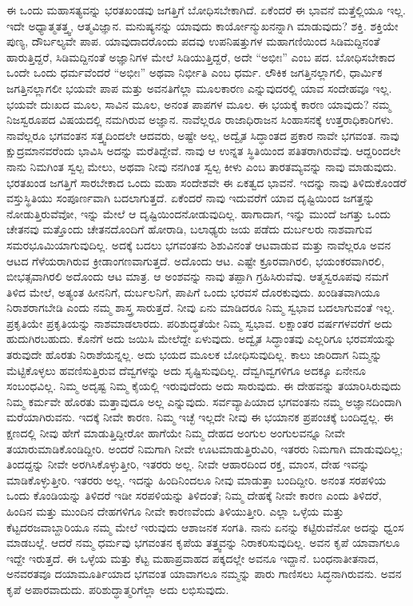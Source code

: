 ಈ ಒಂದು ಮಹಾಸತ್ಯವನ್ನು ಭರತಖಂಡವು ಜಗತ್ತಿಗೆ ಬೋಧಿಸಬೇಕಾಗಿದೆ. ಏಕೆಂದರೆ ಈ ಭಾವನೆ ಮತ್ತೆಲ್ಲಿಯೂ ಇಲ್ಲ. ಇದೇ ಅಧ್ಯಾತ್ಮತತ್ತ್ವ, ಆತ್ಮವಿಜ್ಞಾನ. ಮನುಷ್ಯನನ್ನು ಯಾವುದು ಕಾರ್ಯೋನ್ಮುಖನನ್ನಾಗಿ ಮಾಡುವುದು? ಶಕ್ತಿ. ಶಕ್ತಿಯೇ ಪುಣ್ಯ, ದೌರ್ಬಲ್ಯವೇ ಪಾಪ. ಯಾವುದಾದರೊಂದು ಪದವು ಉಪನಿಷತ್ತುಗಳ ಮಹಾಗಣಿಯಿಂದ ಸಿಡಿಮದ್ದಿನಂತೆ ಹಾರುತ್ತಿದ್ದರೆ, ಸಿಡಿಮದ್ದಿನಂತೆ ಅಜ್ಞಾನಿಗಳ ಮೇಲೆ ಸಿಡಿಯುತ್ತಿದ್ದರೆ, ಅದೇ “ಅಭೀಃ” ಎಂಬ ಪದ. ಬೋಧಿಸಬೇಕಾದ ಒಂದೇ ಒಂದು ಧರ್ಮವೆಂದರೆ “ಅಭೀಃ” ಅಥವಾ ನಿರ್ಭೀತಿ ಎಂಬ ಧರ್ಮ. ಲೌಕಿಕ ಜಗತ್ತಿನಲ್ಲಾಗಲಿ, ಧಾರ್ಮಿಕ ಜಗತ್ತಿನಲ್ಲಾಗಲೀ ಭಯವೇ ಪಾಪ ಮತ್ತು ಅವನತಿಗೆಲ್ಲಾ ಮೂಲಕಾರಣ ಎನ್ನುವುದರಲ್ಲಿ ಯಾವ ಸಂದೇಹವೂ ಇಲ್ಲ. ಭಯವೇ ದುಃಖದ ಮೂಲ, ಸಾವಿನ ಮೂಲ, ಅನಂತ ಪಾಪಗಳ ಮೂಲ. ಈ ಭಯಕ್ಕೆ ಕಾರಣ ಯಾವುದು? ನಮ್ಮ ನಿಜಸ್ವರೂಪದ ವಿಷಯದಲ್ಲಿ ನಮಗಿರುವ ಅಜ್ಞಾನ. ನಾವೆಲ್ಲರೂ ರಾಜಾಧಿರಾಜನ ಸಿಂಹಾಸನಕ್ಕೆ ಉತ್ತರಾಧಿಕಾರಿಗಳು. ನಾವೆಲ್ಲರೂ ಭಗವಂತನ ಸತ್ತ್ವದಿಂದಲೇ ಆದವರು, ಅಷ್ಟೇ ಅಲ್ಲ, ಅದ್ವೈತ ಸಿದ್ಧಾಂತದ ಪ್ರಕಾರ ನಾವೇ ಭಗವಂತ. ನಾವು ಕ್ಷುದ್ರಮಾನವರೆಂದು ಭಾವಿಸಿ ಅದನ್ನು ಮರೆತಿದ್ದೇವೆ. ನಾವು ಆ ಉನ್ನತ ಸ್ಥಿತಿಯಿಂದ ಪತಿತರಾಗಿರುವೆವು. ಆದ್ದರಿಂದಲೇ ನಾನು ನಿಮಗಿಂತ ಸ್ವಲ್ಪ ಮೇಲು, ಅಥವಾ ನೀವು ನನಗಿಂತ ಸ್ವಲ್ಪ ಕೀಳು ಎಂಬ ತಾರತಮ್ಯವನ್ನು ನಾವು ಮಾಡುವುದು. ಭರತಖಂಡ ಜಗತ್ತಿಗೆ ಸಾರಬೇಕಾದ ಒಂದು ಮಹಾ ಸಂದೇಶವೇ ಈ ಏಕತ್ವದ ಭಾವನೆ. ಇದನ್ನು ನಾವು ತಿಳಿದುಕೊಂಡರೆ ವಸ್ತುಸ್ಥಿತಿಯು ಸಂಪೂರ್ಣವಾಗಿ ಬದಲಾಗುತ್ತದೆ. ಏಕೆಂದರೆ ನಾವು ಇದುವರೆಗೆ ಯಾವ ದೃಷ್ಟಿಯಿಂದ ಜಗತ್ತನ್ನು ನೋಡುತ್ತಿರುವೆವೋ, ಇನ್ನು ಮೇಲೆ ಆ ದೃಷ್ಟಿಯಿಂದ\break ನೋಡುವುದಿಲ್ಲ. ಹಾಗಾದಾಗ, ಇನ್ನು ಮುಂದೆ ಜಗತ್ತು ಒಂದು ಚೇತನವು ಮತ್ತೊಂದು ಚೇತನದೊಂದಿಗೆ ಹೋರಾಡಿ, ಬಲಾಢ್ಯರು ಜಯ ಪಡೆದು ದುರ್ಬಲರು ನಾಶವಾಗುವ ಸಮರಭೂಮಿಯಾಗುವುದಿಲ್ಲ. ಅದಕ್ಕೆ ಬದಲು ಭಗವಂತನು ಶಿಶುವಿನಂತೆ ಆಟವಾಡುವ ಮತ್ತು ನಾವೆಲ್ಲರೂ ಅವನ ಆಟದ ಗೆಳೆಯರಾಗಿರುವ ಕ್ರೀಡಾಂಗಣವಾಗುತ್ತದೆ. ಅದೊಂದು ಆಟ. ಎಷ್ಟೇ ಕ್ರೂರವಾಗಿರಲಿ, ಭಯಂಕರವಾಗಿರಲಿ, ಬೀಭತ್ಸವಾಗಿರಲಿ ಅದೊಂದು ಆಟ ಮಾತ್ರ. ಆ ಅಂಶವನ್ನು ನಾವು ತಪ್ಪಾಗಿ ಗ್ರಹಿಸಿರುವೆವು. ಆತ್ಮಸ್ವರೂಪವು ನಮಗೆ ತಿಳಿದ ಮೇಲೆ, ಅತ್ಯಂತ ಹೀನನಿಗೆ, ದುರ್ಬಲನಿಗೆ, ಪಾಪಿಗೆ ಒಂದು ಭರವಸೆ ದೊರಕುವುದು. ಖಂಡಿತವಾಗಿಯೂ ನಿರಾಶರಾಗಬೇಡಿ ಎಂದು ನಮ್ಮ ಶಾಸ್ತ್ರ ಸಾರುತ್ತದೆ. ನೀವು ಏನು ಮಾಡಿದರೂ ನಿಮ್ಮ ಸ್ವಭಾವ ಬದಲಾಗುವಂತೆ ಇಲ್ಲ. ಪ್ರಕೃತಿಯೇ ಪ್ರಕೃತಿಯನ್ನು ನಾಶಮಾಡಲಾರದು. ಪರಿಶುದ್ಧತೆಯೇ ನಿಮ್ಮ ಸ್ವಭಾವ. ಲಕ್ಷಾಂತರ ವರ್ಷಗಳವರೆಗೆ ಅದು ಹುದುಗಿರಬಹುದು. ಕೊನೆಗೆ ಅದು ಜಯಿಸಿ ಮೇಲೆದ್ದೇ ಏಳುವುದು. ಅದ್ವೈತ ಸಿದ್ಧಾಂತವು ಎಲ್ಲರಿಗೂ ಭರವಸೆಯನ್ನು ತರುವುದೇ ಹೊರತು ನಿರಾಶೆಯನ್ನಲ್ಲ. ಅದು ಭಯದ ಮೂಲಕ ಬೋಧಿಸುವುದಿಲ್ಲ. ಕಾಲು ಜಾರಿದಾಗ ನಿಮ್ಮನ್ನು ಮೆಟ್ಟಿಕೊಳ್ಳಲು ಹವಣಿಸುತ್ತಿರುವ ದೆವ್ವಗಳನ್ನು ಅದು ಸೃಷ್ಟಿಸುವುದಿಲ್ಲ. ದೆವ್ವಗಿವ್ವಗಳಿಗೂ ಅದಕ್ಕೂ ಏನೇನೂ ಸಂಬಂಧವಿಲ್ಲ. ನಿಮ್ಮ ಅದೃಷ್ಟ ನಿಮ್ಮ ಕೈಯಲ್ಲಿ ಇರುವುದೆಂದು ಅದು ಸಾರುವುದು. ಈ ದೇಹವನ್ನು ತಯಾರಿಸಿರುವುದು ನಿಮ್ಮ ಕರ್ಮವೇ ಹೊರತು ಮತ್ತಾವುದೂ ಅಲ್ಲ ಎನ್ನುವುದು. ಸರ್ವವ್ಯಾಪಿಯಾದ ಭಗವಂತನು ನಮ್ಮ ಅಜ್ಞಾನದಿಂದಾಗಿ ಮರೆಯಾಗಿರುವನು. ಇದಕ್ಕೆ ನೀವೇ ಕಾರಣ. ನಿಮ್ಮ ಇಚ್ಛೆ ಇಲ್ಲದೇ ನೀವು ಈ ಭಯಾನಕ ಪ್ರಪಂಚಕ್ಕೆ ಬಂದಿದ್ದಲ್ಲ. ಈ ಕ್ಷಣದಲ್ಲಿ ನೀವು ಹೇಗೆ ಮಾಡುತ್ತಿದ್ದೀರೋ ಹಾಗೆಯೇ ನಿಮ್ಮ ದೇಹದ ಅಂಗುಲ ಅಂಗುಲವನ್ನೂ ನೀವೇ ತಯಾರುಮಾಡಿಕೊಂಡಿದ್ದೀರಿ. ಅಂದರೆ ನಿಮಗಾಗಿ ನೀವೇ ಊಟಮಾಡುತ್ತಿರುವಿರಿ, ಇತರರು ನಿಮಗಾಗಿ ಮಾಡುವುದಿಲ್ಲ; ತಿಂದದ್ದನ್ನು ನೀವೇ ಅರಗಿಸಿಕೊಳ್ಳುತ್ತೀರಿ, ಇತರರು ಅಲ್ಲ. ನೀವೇ ಆಹಾರದಿಂದ ರಕ್ತ, ಮಾಂಸ, ದೇಹ ಇವನ್ನು ಮಾಡಿಕೊಳ್ಳುತ್ತೀರಿ. ಇತರರು ಅಲ್ಲ. ಇದನ್ನು ಹಿಂದಿನಿಂದಲೂ ನೀವು ಮಾಡುತ್ತಾ ಬಂದಿದ್ದೀರಿ. ಅನಂತ ಸರಪಳಿಯ ಒಂದು ಕೊಂಡಿಯನ್ನು ತಿಳಿದರೆ ಇಡೀ ಸರಪಳಿಯನ್ನು ತಿಳಿದಂತೆ; ನಿಮ್ಮ ದೇಹಕ್ಕೆ ನೀವೇ ಕಾರಣ ಎಂದು ತಿಳಿದರೆ, ಹಿಂದಿನ ಮತ್ತು ಮುಂದಿನ ದೇಹಗಳಿಗೂ ನೀವೇ ಕಾರಣವೆಂದು ತಿಳಿಯುತ್ತೀರಿ. ಎಲ್ಲಾ ಒಳ್ಳೆಯ ಮತ್ತು ಕೆಟ್ಟದರ\break ಜವಾಬ್ದಾರಿಯೂ ನಮ್ಮ ಮೇಲೆ ಇರುವುದು ಆಶಾಜನಕ ಸಂಗತಿ. ನಾನು ಏನನ್ನು ಕಟ್ಟಿರುವೆನೋ ಅದನ್ನು ಧ್ವಂಸ ಮಾಡಬಲ್ಲೆ. ಆದರೆ ನಮ್ಮ ಧರ್ಮವು ಭಗವಂತನ ಕೃಪೆಯ ತತ್ತ್ವವನ್ನು ನಿರಾಕರಿಸುವುದಿಲ್ಲ. ಅವನ ಕೃಪೆ ಯಾವಾಗಲೂ ಇದ್ದೇ ಇರುತ್ತದೆ. ಈ ಒಳ್ಳೆಯ ಮತ್ತು ಕೆಟ್ಟ ಮಹಾಪ್ರವಾಹದ ಪಕ್ಕದಲ್ಲೇ ಅವನೂ ಇದ್ದಾನೆ. ಬಂಧನಾತೀತನಾದ, ಅನವರತವೂ ದಯಾಮೂರ್ತಿಯಾದ ಭಗವಂತ ಯಾವಾಗಲೂ ನಮ್ಮನ್ನು ಪಾರು ಗಾಣಿಸಲು ಸಿದ್ಧನಾಗಿರುವನು. ಅವನ ಕೃಪೆ ಅಪಾರವಾದುದು. ಪರಿಶುದ್ಧಾತ್ಮರಿಗೆಲ್ಲಾ ಅದು ಲಭಿಸುವುದು.

